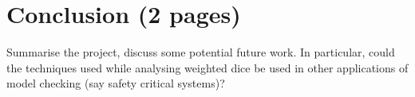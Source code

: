 \chapter{Conclusion (2 pages)}    

Summarise the project, discuss some potential future work. In particular, could the techniques used while analysing weighted dice be used in other applications of model checking (say safety critical systems)?

\Blindtext

\Blindtext